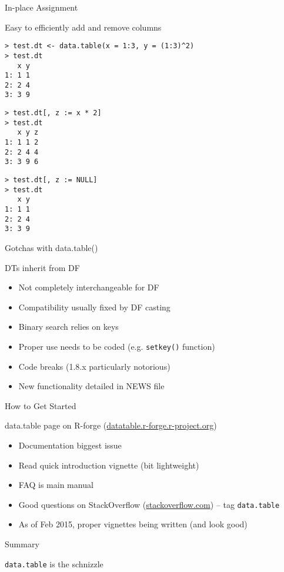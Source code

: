 \documentclass[12pt]{beamer}
\begin{document}
\begin{frame}[fragile]{In-place Assignment}

Easy to efficiently add and remove columns

\pause
\begin{verbatim}
> test.dt <- data.table(x = 1:3, y = (1:3)^2)
> test.dt
   x y
1: 1 1
2: 2 4
3: 3 9
\end{verbatim}

\pause
\begin{verbatim}
> test.dt[, z := x * 2]
> test.dt
   x y z
1: 1 1 2
2: 2 4 4
3: 3 9 6
\end{verbatim}

\pause
\begin{verbatim}
> test.dt[, z := NULL]
> test.dt
   x y
1: 1 1
2: 2 4
3: 3 9
\end{verbatim}

\end{frame}


\begin{frame}{Gotchas with data.table()}

DTs inherit from DF

\begin{itemize}
\item<2-> Not completely interchangeable for DF
\item<3-> Compatibility usually fixed by DF casting
\item<4-> Binary search relies on keys
\item<5-> Proper use needs to be coded (e.g. \texttt{setkey()} function)
\item<6-> Code breaks (1.8.x particularly notorious)
\item<7-> New functionality detailed in NEWS file
\end{itemize}

\end{frame}


\begin{frame}{How to Get Started}

data.table page on R-forge (\url{datatable.r-forge.r-project.org})

\begin{itemize}
\item<2-> Documentation biggest issue
\item<3-> Read quick introduction vignette (bit lightweight)
\item<4-> FAQ is main manual
\item<5-> Good questions on StackOverflow (\url{stackoverflow.com}) -- tag \texttt{data.table}
\item<6-> As of Feb 2015, proper vignettes being written (and look good)
\end{itemize}

\end{frame}


\begin{frame}{Summary}

\pause
\begin{center}
\Huge
\texttt{data.table} is the schnizzle
\end{center}
\end{frame}
\end{document}
